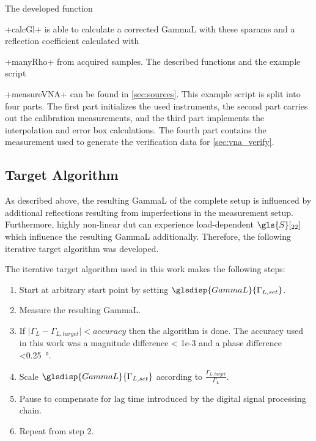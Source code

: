 \documentclass[12pt,a4paper,parskip=full,abstract=true,BCOR=12mm]{scrreprt}
\providecommand{\abs}[1]{\lvert#1\rvert}
\newcommand*{\SavedLstInline}{}
\DeclareRobustCommand*{\lstinline}{%
  \ifmmode
    \let\SavedBGroup\bgroup
    \def\bgroup{%
      \let\bgroup\SavedBGroup
      \hbox\bgroup
    }%
  \fi
  \SavedLstInline
}
\begin{document}
The developed function \lstinline+calcGl+ is able to calculate a corrected \gls{GammaL}
with these \glspl{sparam} and a reflection coefficient calculated with \lstinline+manyRho+
from acquired samples. The described functions and the example script \lstinline+measureVNA+
can be found in \cref{sec:sources}. This example script is split into four parts. The
first part initializes the used instruments, the second part carries out the
calibration measurements, and the third part implements the interpolation
and error box calculations. The fourth part contains the measurement used to generate
the verification data for \cref{sec:vna_verify}.


\subsection{Target Algorithm}
\label{sec:target}

As described above, the resulting \gls{GammaL} of the complete setup is
influenced by additional reflections resulting from imperfections in the
measurement setup. Furthermore, highly non-linear \gls{dut}
can experience load-dependent $\gls{S}[_{22}]$ which influence
the resulting \gls{GammaL} additionally. Therefore, the following iterative
target algorithm was developed.

The iterative target algorithm used in this work makes the following steps:
\begin{enumerate}
    \item Start at arbitrary start point by setting $\glsdisp{GammaL}{\Gamma_{L,set}}$.
    \item Measure the resulting \gls{GammaL}.
    \item If $\abs{\Gamma_L - \Gamma_{L,target}} < accuracy$ then the algorithm is done. The
        accuracy used in this work was a magnitude difference \num{< 1e-3} and a phase difference \SI{<0.25}{\degree}.
    \item Scale $\glsdisp{GammaL}{\Gamma_{L,set}}$ according to $\frac{\Gamma_{L,target}}{\Gamma_L}$.
    \item Pause to compensate for lag time introduced by the digital signal processing chain.
    \item Repeat from step 2.
\end{enumerate}
\end{document}
